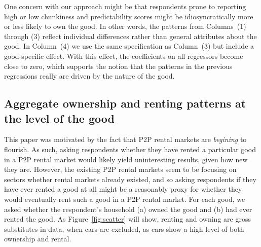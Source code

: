 \documentclass[11pt]{article}
\begin{document}
One concern with our approach might be that respondents prone to reporting high or low chunkiness and predictability scores might be idiosyncratically more or less likely to own the good.
In other words, the patterns from Columns~(1) through (3) reflect individual differences rather than general attributes about the good.
In Column~(4) we use the same specification as Column~(3) but include a good-specific effect.
With this effect, the coefficients on all regressors become close to zero, which supports the notion that the patterns in the previous regressions really are driven by the nature of the good. 

\subsection{Aggregate ownership and renting patterns at the level of the good}

This paper was motivated by the fact that P2P rental markets are \emph{begining} to flourish.
As such, asking respondents whether they have rented a particular good in a P2P rental market would likely yield uninteresting results, given how new they are.
However, the existing P2P rental markets seem to be focusing on sectors whether rental markets already existed, and so asking respondents if they have ever rented a good at all might be a reasonably proxy for whether they would eventually rent such a good in a P2P rental market. 
For each good, we asked whether the respondent's household (a) owned the good and (b) had ever rented the good.
As Figure~\ref{fig:scatter} will show, renting and owning are gross substitutes in data, when cars are excluded, as cars show a high level of both ownership and rental. 
\end{document}

